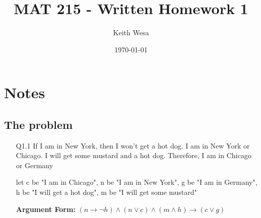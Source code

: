 \documentclass{article}
\author{Keith Wesa}
\title{MAT 215 - Written Homework 1}
\date{\today}
\begin{document}
\section*{Notes}
\subsection*{The problem}
\begin{itemize}
    \item[Q1.1] If I am in New York, then I won't get a hot dog. I am in New York or Chicago.
     I will get some mustard and a hot dog. Therefore, I am in Chicago or Germany
     \item[] let c be "I am in Chicago", n be "I am in New York", g be "I am in Germany", h be "I will get a hot dog", 
        m be "I will get some mustard"
    \item[] \textbf{Argument Form: } $(n \rightarrow \neg h) \land (n \lor c) \land (m \land h) \rightarrow (c \lor g)$
\end{itemize}
\end{document}
